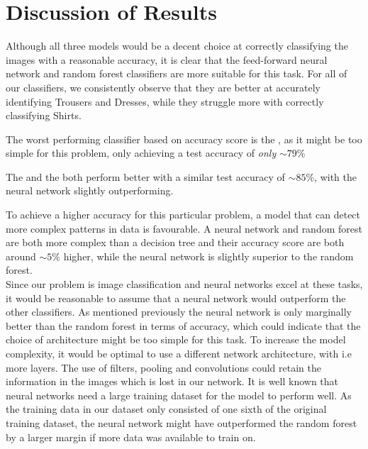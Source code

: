 \section{Discussion of Results}
Although all three models would be a decent choice at correctly classifying the images with a reasonable accuracy, it is clear that the feed-forward neural network and random forest classifiers are more suitable for this task.
For all of our classifiers, we consistently observe that they are better at accurately identifying Trousers and Dresses, while they struggle more with correctly classifying Shirts.
\newline

The worst performing classifier based on accuracy score is the , as it might be too simple for this problem, only achieving a test accuracy of \textit{only} $\sim79\%$
\newline

The  and the  both perform better with a similar test accuracy of $\sim85\%$, with the neural network slightly outperforming.
\newline

To achieve a higher accuracy for this particular problem, a model that can detect more complex patterns in data is favourable.
A neural network and random forest are both more complex than a decision tree and their accuracy score are both around $\sim5\%$ higher,
while the neural network is slightly superior to the random forest. \\

Since our problem is image classification and neural networks excel at these tasks, it would be reasonable to assume that a neural network would outperform the other classifiers.
As mentioned previously the neural network is only marginally better than the random forest in terms of accuracy, which could indicate that the choice of architecture might be too simple for this task.
To increase the model complexity, it would be optimal to use a different network architecture, with i.e more layers.
The use of filters, pooling and convolutions could retain the information in the images which is lost in our network.
It is well known that neural networks need a large training dataset for the model to perform well.
As the training data in our dataset only consisted of one sixth of the original training dataset,
the neural network might have outperformed the random forest by a larger margin if more data was available to train on.


